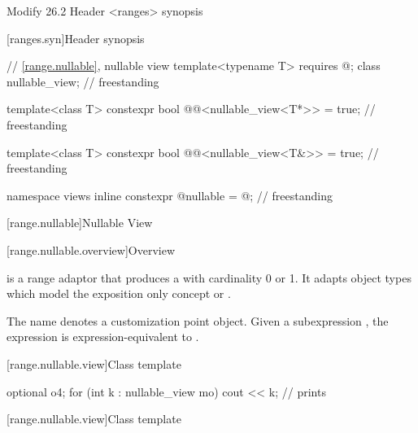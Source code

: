 \documentclass[a4paper,10pt,oneside,openany,final,article]{memoir}
\begin{document}
\begin{wording}
Modify 26.2 Header <ranges> synopsis

[ranges.syn]{Header  synopsis}

\begin{adjustwidth}{1cm}{1cm}
  \begin{addedblock}
    \begin{codeblock}
// \ref{range.nullable}, nullable view
template<typename T>
requires @\seebelow@;
class nullable_view;                                       // freestanding

template<class T>
constexpr bool
@@<nullable_view<T*>> = true;  // freestanding

template<class T>
constexpr bool
@@<nullable_view<T&>> = true;  // freestanding

namespace views {
  inline constexpr @\unspec@ nullable = @\unspec@;          // freestanding
}



    \end{codeblock}
  \end{addedblock}
\end{adjustwidth}


[range.nullable]{Nullable View}

[range.nullable.overview]{Overview}

\pnum
{} is a range adaptor that produces a  with cardinality 0 or 1. It adapts object types which model the exposition only concept  or .


\pnum
{}%
The name  denotes a
customization point object.
Given a subexpression , the expression
 is expression-equivalent to
.

[range.nullable.view]{Class template }

\begin{example}
  \begin{codeblock}
    optional o{4};
    for (int k : nullable_view m{o})
      cout << k;        // prints 
  \end{codeblock}
\end{example}

[range.nullable.view]{Class template }


\end{wording}
\end{document}
